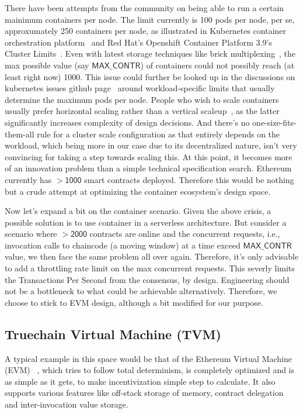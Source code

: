 \smallskip
There have been attempts from the community on being able to run a certain mainimum containers per node. The limit currently is 100 pods
per node, per se, approxumately 250 containers per node, as illustrated in Kubernetes container orchestration platform~\cite{kubelimit}
and Red Hat's Openshift Container Platform 3.9's Cluster Limits~\cite{ocpclusterlimit}. Even with latest storage techniques like
brick multiplexing~\cite{brickmul}, the max possible value (say $\mathsf{MAX\_CONTR}$) of containers could not possibly reach
(at least right now) 1000. This issue could further be looked up in the discussions on kubernetes issues
github page~\cite{k8scale} around workload-specific limits that usually determine the maximum pods per node.
People who wish to scale containers usually prefer horizontal scaling rather than a vertical scaleup~\cite{cncfscaleout, kubecommgoals},
as the latter significantly increases complexity of design decisions. And there's no one-size-fits-them-all rule for a cluster scale
configuration as that entirely depends on the workload, which being more in our case due to its decentralized nature, isn't very
convincing for taking a step towards scaling this. At this point, it becomes more of an innovation problem than a simple technical
specification search. Ethereum currently has $\mathsf{ > 1000 }$ smart contracts deployed. Therefore this would be nothing but a crude
attempt at optimizing the container ecosystem's design space.

Now let's expand a bit on the container scenario. Given the above crisis, a possible solution is to use container in a
serverless architecture. But consider a scenario where $\mathsf{> 2000}$ contracts are online and the concurrent requests,
i.e., invocation calls to chaincode (a moving window) at a time exceed $\mathsf{MAX\_CONTR}$ value, we then face the same
problem all over again. Therefore, it's only advisable to add a throttling rate limit on the max concurrent requests.
This severly limits the Transactions Per Second from the consensus, by design. Engineering should not be a bottleneck to what could
be achievable alternatively. Therefore, we choose to stick to EVM design, although a bit modified for our purpose.

\subsection{Truechain Virtual Machine (TVM)}
\label{sec:tvm}

A typical example in this space would be that of the Ethereum Virtual Machine (EVM) ~\cite{gavinethereum}, which tries to follow
total determinism, is completely optimized and is as simple as it gets, to make incentivization simple step to calculate.
It also supports various features like off-stack storage of memory, contract delegation and inter-invocation value storage.

